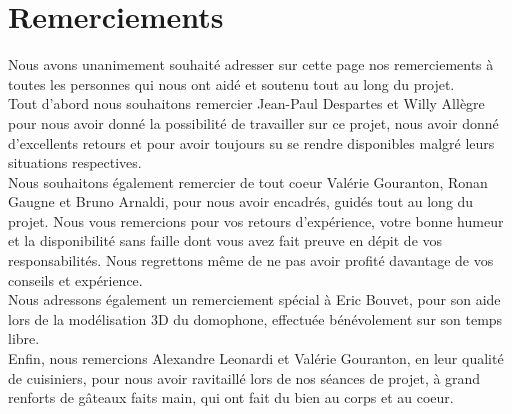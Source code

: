 \section{Remerciements}

Nous avons unanimement souhaité adresser sur cette page nos remerciements à toutes les personnes qui nous ont aidé et soutenu tout au long du projet.
\\ \newline
Tout d'abord nous souhaitons remercier Jean-Paul Despartes et Willy Allègre pour nous avoir donné la possibilité de travailler sur ce projet, nous avoir donné d'excellents retours et pour avoir toujours su se rendre disponibles malgré leurs situations respectives.
\\ \newline
Nous souhaitons également remercier de tout coeur Valérie Gouranton, Ronan Gaugne et Bruno Arnaldi, pour nous avoir encadrés, guidés tout au long du projet. Nous vous remercions pour vos retours d'expérience, votre bonne humeur et la disponibilité sans faille dont vous avez fait preuve en dépit de vos responsabilités. Nous regrettons même de ne pas avoir profité davantage de vos conseils et expérience.
\\ \newline
Nous adressons également un remerciement spécial à Eric Bouvet, pour son aide lors de la modélisation 3D du domophone, effectuée bénévolement sur son temps libre.
\\ \newline
Enfin, nous remercions Alexandre Leonardi et Valérie Gouranton, en leur qualité de cuisiniers, pour nous avoir ravitaillé lors de nos séances de projet, à grand renforts de gâteaux faits main, qui ont fait du bien au corps et au coeur.
